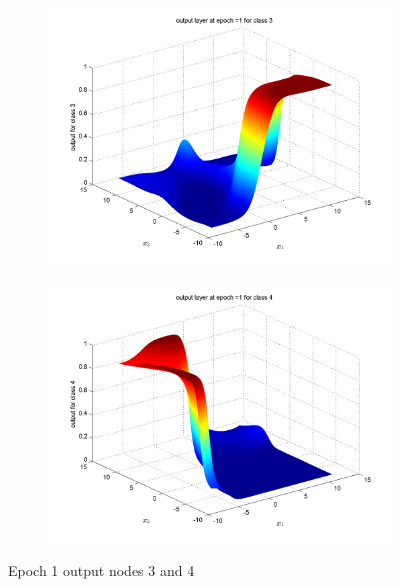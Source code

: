 \documentclass{article}
\begin{document}
\begin{figure}
\begin{subfigure}{.5\textwidth}
  \centering
  \includegraphics[width=.8\linewidth]{Classification/overlapping/1_3}
 
\end{subfigure}%
\begin{subfigure}{.5\textwidth}
  \centering
  \includegraphics[width=.8\linewidth]{Classification/overlapping/1_4}
  \end{subfigure}
\caption{Epoch 1 output nodes 3 and 4}
\end{figure}
\end{document}
